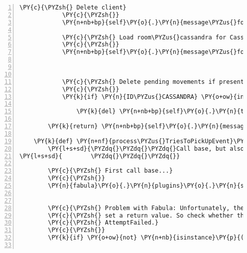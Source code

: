 \begin{Verbatim}[commandchars=\\\{\},numbers=left,firstnumber=1,stepnumber=1]
            \PY{c}{\PYZsh{} Delete client}
            \PY{c}{\PYZsh{}}
            \PY{n+nb+bp}{self}\PY{o}{.}\PY{n}{message\PYZus{}for\PYZus{}host}\PY{o}{.}\PY{n}{event\PYZus{}list}\PY{o}{.}\PY{n}{append}\PY{p}{(}\PY{n}{fabula}\PY{o}{.}\PY{n}{DeleteEvent}\PY{p}{(}\PY{n}{ID\PYZus{}CASSANDRA}\PY{p}{)}\PY{p}{)}

            \PY{c}{\PYZsh{} Load room\PYZus{}cassandra for Cassandra and spawn her at position (6, 3)}
            \PY{c}{\PYZsh{}}
            \PY{n+nb+bp}{self}\PY{o}{.}\PY{n}{message\PYZus{}for\PYZus{}host}\PY{o}{.}\PY{n}{event\PYZus{}list}\PY{o}{.}\PY{n}{extend}\PY{p}{(}\PY{n+nb+bp}{self}\PY{o}{.}\PY{n}{\PYZus{}load\PYZus{}room}\PY{p}{(}\PY{n}{ID\PYZus{}CASSANDRA}\PY{p}{,}
                                                                    \PY{l+s}{\PYZdq{}}\PY{l+s}{room\PYZus{}cassandra}\PY{l+s}{\PYZdq{}}\PY{p}{,}
                                                                    \PY{p}{(}\PY{l+m+mi}{6}\PY{p}{,} \PY{l+m+mi}{3}\PY{p}{)}\PY{p}{)}\PY{p}{)}

            \PY{c}{\PYZsh{} Delete pending movements if present}
            \PY{c}{\PYZsh{}}
            \PY{k}{if} \PY{n}{ID\PYZus{}CASSANDRA} \PY{o+ow}{in} \PY{n+nb+bp}{self}\PY{o}{.}\PY{n}{tries\PYZus{}to\PYZus{}move\PYZus{}dict}\PY{o}{.}\PY{n}{keys}\PY{p}{(}\PY{p}{)}\PY{p}{:}

                \PY{k}{del} \PY{n+nb+bp}{self}\PY{o}{.}\PY{n}{tries\PYZus{}to\PYZus{}move\PYZus{}dict}\PY{p}{[}\PY{n}{ID\PYZus{}CASSANDRA}\PY{p}{]}

        \PY{k}{return} \PY{n+nb+bp}{self}\PY{o}{.}\PY{n}{message\PYZus{}for\PYZus{}host}

    \PY{k}{def} \PY{n+nf}{process\PYZus{}TriesToPickUpEvent}\PY{p}{(}\PY{n+nb+bp}{self}\PY{p}{,} \PY{n}{event}\PY{p}{)}\PY{p}{:}
        \PY{l+s+sd}{\PYZdq{}\PYZdq{}\PYZdq{}Call base, but also respond().}
\PY{l+s+sd}{        \PYZdq{}\PYZdq{}\PYZdq{}}

        \PY{c}{\PYZsh{} First call base...}
        \PY{c}{\PYZsh{}}
        \PY{n}{fabula}\PY{o}{.}\PY{n}{plugins}\PY{o}{.}\PY{n}{serverside}\PY{o}{.}\PY{n}{DefaultGame}\PY{o}{.}\PY{n}{process\PYZus{}TriesToPickUpEvent}\PY{p}{(}\PY{n+nb+bp}{self}\PY{p}{,}
                                                                         \PY{n}{event}\PY{p}{)}

        \PY{c}{\PYZsh{} Problem with Fabula: Unfortunately, the process\PYZus{}... handlers do not}
        \PY{c}{\PYZsh{} set a return value. So check whether the most recent event is not}
        \PY{c}{\PYZsh{} AttemptFailed.}
        \PY{c}{\PYZsh{}}
        \PY{k}{if} \PY{o+ow}{not} \PY{n+nb}{isinstance}\PY{p}{(}\PY{n+nb+bp}{self}\PY{o}{.}\PY{n}{message\PYZus{}for\PYZus{}host}\PY{o}{.}\PY{n}{event\PYZus{}list}\PY{p}{[}\PY{o}{\PYZhy{}}\PY{l+m+mi}{1}\PY{p}{]}\PY{p}{,} \PY{n}{fabula}\PY{o}{.}\PY{n}{AttemptFailedEvent}\PY{p}{)}\PY{p}{:}


\end{Verbatim}
